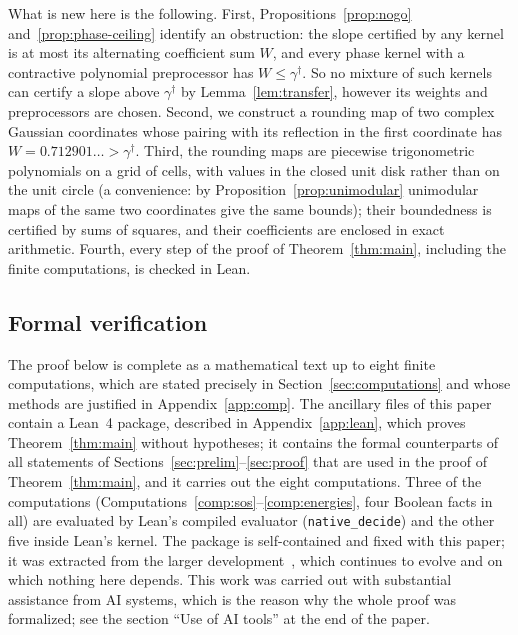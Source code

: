 \documentclass[11pt,reqno]{amsart}
\theoremstyle{definition}
\numberwithin{equation}{section}
\newcommand{\gd}{\gamma^\dagger}
\begin{document}
What is new here is the following. First, Propositions~\ref{prop:nogo} and~\ref{prop:phase-ceiling} identify an obstruction: the slope certified by any kernel is at most its alternating coefficient sum $W$, and every phase kernel with a contractive polynomial preprocessor has $W\le\gd$. So no mixture of such kernels can certify a slope above $\gd$ by Lemma~\ref{lem:transfer}, however its weights and preprocessors are chosen. Second, we construct a rounding map of two complex Gaussian coordinates whose pairing with its reflection in the first coordinate has $W=0.712901\ldots>\gd$. Third, the rounding maps are piecewise trigonometric polynomials on a grid of cells, with values in the closed unit disk rather than on the unit circle (a convenience: by Proposition~\ref{prop:unimodular} unimodular maps of the same two coordinates give the same bounds); their boundedness is certified by sums of squares, and their coefficients are enclosed in exact arithmetic. Fourth, every step of the proof of Theorem~\ref{thm:main}, including the finite computations, is checked in Lean.

\subsection{Formal verification}
The proof below is complete as a mathematical text up to eight finite computations, which are stated precisely in Section~\ref{sec:computations} and whose methods are justified in Appendix~\ref{app:comp}. The ancillary files of this paper contain a Lean~4 package, described in Appendix~\ref{app:lean}, which proves Theorem~\ref{thm:main} without hypotheses; it contains the formal counterparts of all statements of Sections~\ref{sec:prelim}--\ref{sec:proof} that are used in the proof of Theorem~\ref{thm:main}, and it carries out the eight computations. Three of the computations (Computations~\ref{comp:sos}--\ref{comp:energies}, four Boolean facts in all) are evaluated by Lean's compiled evaluator (\texttt{native\_decide}) and the other five inside Lean's kernel. The package is self-contained and fixed with this paper; it was extracted from the larger development~\cite{Gal26}, which continues to evolve and on which nothing here depends. This work was carried out with substantial assistance from AI systems, which is the reason why the whole proof was formalized; see the section ``Use of AI tools'' at the end of the paper.
\end{document}
